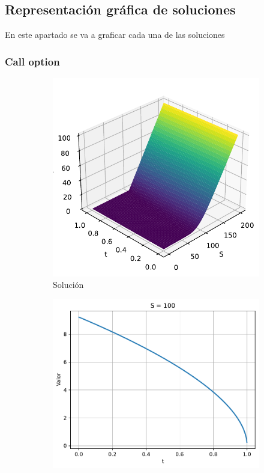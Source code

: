 \subsection{Representación gráfica de soluciones}
En este apartado se va a graficar cada una de las soluciones
\subsubsection{Call option}
\begin{figure}[H]
    \centering
    \begin{subfigure}[b]{0.3\linewidth}
        \includegraphics[width=\linewidth]{Imagenes/Parte1/6_Sols/Call/Call3D.pdf}
        \caption{Solución}
    \end{subfigure}
    \begin{subfigure}[b]{0.3\linewidth}
        \includegraphics[width=\linewidth]{Imagenes/Parte1/6_Sols/Call/CallSFijo.pdf}

\end{subfigure}
\end{figure}
